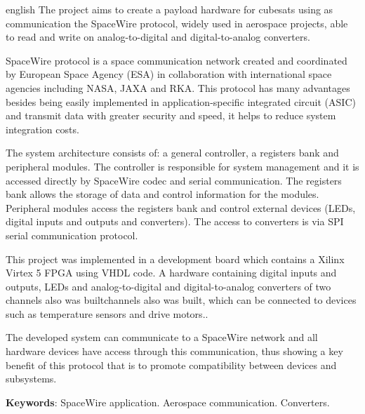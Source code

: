 \documentclass[
	12pt,				%
	openright,			%
	twoside,			%
	a4paper,			%
	english,			%
	french,				%
	spanish,			%
	brazil				%
	]{abntex2}
\begin{document}
\begin{resumo}[Abstract]
 \begin{otherlanguage*}{english}
    The project aims to create a payload hardware for cubesats using as communication the SpaceWire protocol, widely used in aerospace projects, able to read and write on analog-to-digital and digital-to-analog converters.
    
    SpaceWire protocol is a space communication network created and coordinated by European Space Agency (ESA) in collaboration with international space agencies including NASA, JAXA and RKA. This protocol has many advantages besides being easily implemented in application-specific integrated circuit (ASIC) and transmit data with greater security and speed, it helps to reduce system integration costs.
    
    The system architecture consists of: a general controller, a registers bank and peripheral modules. The controller is responsible for system management and it is accessed directly by SpaceWire codec and serial communication. The registers bank allows the storage of data and control information for the modules. Peripheral modules access the registers bank and control external devices (LEDs, digital inputs and outputs and converters). The access to converters is via SPI serial communication protocol.
    
    This project was implemented in a development board which contains a Xilinx Virtex 5 FPGA using VHDL code. A hardware containing digital inputs and outputs, LEDs and analog-to-digital and digital-to-analog converters of two channels also was builtchannels also was built, which can be connected to devices such as temperature sensors and drive motors..
    
    The developed system can communicate to a SpaceWire network and all hardware devices have access through this communication, thus showing a key benefit of this protocol that is to promote compatibility between devices and subsystems.

   \vspace{\onelineskip}
 
   \noindent 
   \textbf{Keywords}: SpaceWire application. Aerospace communication. Converters.
 \end{otherlanguage*}
\end{resumo}

%	 
%	
%	  
\end{document}
